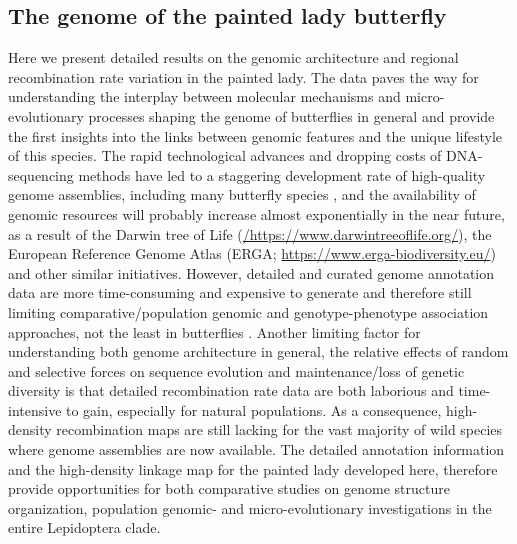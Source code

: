 \documentclass[twocolumn]{bmcart}%
\begin{document}
\subsection*{The genome of the painted lady butterfly}
Here we present detailed results on the genomic architecture and regional recombination rate variation in the painted lady. The data paves the way for understanding the interplay between molecular mechanisms and micro-evolutionary processes shaping the genome of butterflies in general and provide the first insights into the links between genomic features and the unique lifestyle of this species. The rapid technological advances and dropping costs of DNA-sequencing methods have led to a staggering development rate of high-quality genome assemblies, including many butterfly species \citep{celorio-manceraChromosomeLevelAssembly2021, guDichotomyDosageCompensation2019, liOutbredGenomeSequencing2015, smolanderImprovedChromosomelevelGenome2022, yangChromosomeLevelReference2020}, and the availability of genomic resources will probably increase almost exponentially in the near future, as a result of the Darwin tree of Life (\href{https://www.darwintreeoflife.org}{/https://www.darwintreeoflife.org/}), the European Reference Genome Atlas (ERGA; \href{https://www.erga-biodiversity.eu/}{https://www.erga-biodiversity.eu/}) and other similar initiatives. However, detailed and curated genome annotation data are more time-consuming and expensive to generate and therefore still limiting comparative/population genomic and genotype-phenotype association approaches, not the least in butterflies \citep{daveyNoEvidenceMaintenance2017, hillUnprecedentedReorganizationHolocentric2019, vanbelleghemComplexModularArchitecture2017}. Another limiting factor for understanding both genome architecture in general, the relative effects of random and selective forces on sequence evolution and maintenance/loss of genetic diversity is that detailed recombination rate data are both laborious and time-intensive to gain, especially for natural populations. As a consequence, high-density recombination maps are still lacking for the vast majority of wild species where genome assemblies are now available. The detailed annotation information and the high-density linkage map for the painted lady developed here, therefore provide opportunities for both comparative studies on genome structure organization, population genomic- and micro-evolutionary investigations in the entire Lepidoptera clade.
\end{document}
